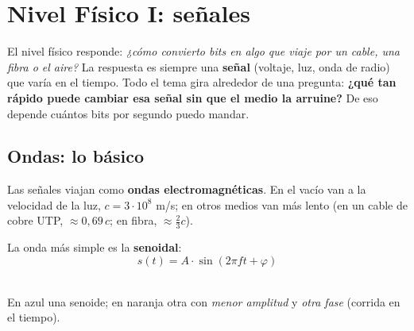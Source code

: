 \documentclass[10pt,a4paper]{article}
\newcommand{\term}[1]{\textbf{\color{azul}#1}}
\begin{document}
\section{Nivel Físico I: señales}

\begin{idea}
El nivel físico responde: \emph{¿cómo convierto bits en algo que viaje por un cable, una fibra o el aire?}
La respuesta es siempre una \textbf{señal} (voltaje, luz, onda de radio) que varía en el tiempo.
Todo el tema gira alrededor de una pregunta: \textbf{¿qué tan rápido puede cambiar esa señal
sin que el medio la arruine?} De eso depende cuántos bits por segundo puedo mandar.
\end{idea}

\subsection{Ondas: lo básico}
Las señales viajan como \term{ondas electromagnéticas}. En el vacío van a la velocidad de la luz,
$c = 3\cdot10^8$ m/s; en otros medios van más lento (en un cable de cobre UTP, $\approx 0{,}69\,c$;
en fibra, $\approx \tfrac23 c$).

La onda más simple es la \term{senoidal}:
\[ s(t) = A\cdot \sin(2\pi f t + \varphi) \]

\begin{center}
\\
{\small En azul una senoide; en naranja otra con \emph{menor amplitud} y \emph{otra fase} (corrida en el tiempo).}
\end{center}
\end{document}
